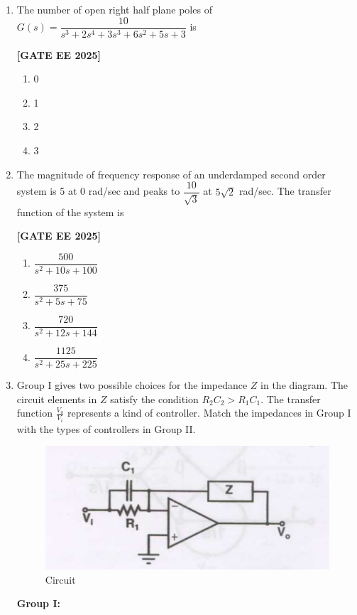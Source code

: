\documentclass[12pt]{article}
\begin{document}
\begin{enumerate}[leftmargin=*, label=\textbf{Q.\arabic*:}]
\item The number of open right half plane poles of $G(s) = \dfrac{10}{s^3 + 2s^4 + 3s^3 + 6s^2 + 5s + 3}$ is
 
\noindent \textbf{[GATE EE 2025]}
\begin{multicols}{4}
\begin{enumerate}
  \item 0
  \item 1
  \item 2
  \item 3
\end{enumerate}
\end{multicols}

\item The magnitude of frequency response of an underdamped second order system is 5 at 0 rad/sec and peaks to $\dfrac{10}{\sqrt{3}}$ at $5 \sqrt{2}$ rad/sec. The transfer function of the system is
 
\noindent \textbf{[GATE EE 2025]}
\begin{multicols}{4}
\begin{enumerate}
  \item $\dfrac{500}{s^2 + 10s + 100}$
  \item $\dfrac{375}{s^2 + 5s + 75}$
  \item $\dfrac{720}{s^2 + 12s + 144}$
  \item $\dfrac{1125}{s^2 + 25s + 225}$
\end{enumerate}
\end{multicols}

\item
Group I gives two possible choices for the impedance $Z$ in the diagram. The circuit elements in $Z$ satisfy the condition $R_2C_2 > R_1C_1$. The transfer function $\frac{V_o}{V_i}$ represents a kind of controller. Match the impedances in Group I with the types of controllers in Group II.
\begin{figure}[H]\centering
\includegraphics[width=0.8\columnwidth]{figs/q43a.png}
\caption{Circuit}
\label{fig:q43a}
\end{figure}
\textbf{Group I:}


\end{enumerate}
\end{document}
